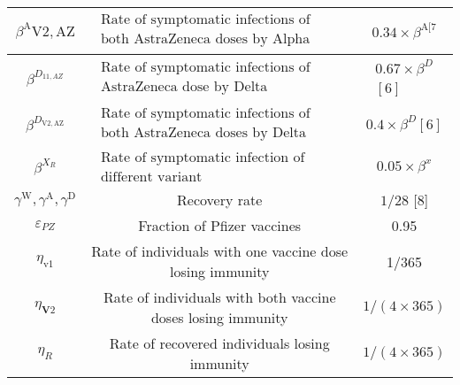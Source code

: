 \documentclass[10pt]{article}
\begin{document}
\begin{center}
\begin{tabular}{|c|c|c|}
\hline
$\beta^{\mathrm{A}} \mathrm{V} 2, \mathrm{AZ}$ & $\begin{array}{l}\text { Rate of symptomatic infections of individuals vaccinated with } \\ \text { both AstraZeneca doses by Alpha }\end{array}$ & $0.34 \times \beta^{\mathrm{A}[7}$ \\
\hline
$\beta^{D_{11, A Z}}$ & $\begin{array}{l}\text { Rate of symptomatic infections of individuals vaccinated with one } \\ \text { AstraZeneca dose by Delta }\end{array}$ & $\begin{array}{l}0.67 \times \beta^{D} \\ {[6]}\end{array}$ \\
\hline
$\beta^{D_{\mathrm{V} 2, \mathrm{AZ}}}$ & $\begin{array}{l}\text { Rate of symptomatic infections of individuals vaccinated with } \\ \text { both AstraZeneca doses by Delta }\end{array}$ & $0.4 \times \beta^{D}[6]$ \\
\hline
$\beta^{X_{R}}$ & $\begin{array}{l}\text { Rate of symptomatic infection of individual recovered from a } \\ \text { different variant }\end{array}$ & $0.05 \times \beta^{x}$ \\
\hline
$\gamma^{\mathrm{W}}, \gamma^{\mathrm{A}}, \gamma^{\mathrm{D}}$ & Recovery rate & $1 / 28$ [8] \\
\hline
$\varepsilon_{P Z}$ & Fraction of Pfizer vaccines & 0.95 \\
\hline
$\eta_{\mathrm{v} 1}$ & Rate of individuals with one vaccine dose losing immunity & 1/365 \\
\hline
$\eta_{\mathbf{V} 2}$ & Rate of individuals with both vaccine doses losing immunity & $1 /(4 \times 365)$ \\
\hline
$\eta_{R}$ & Rate of recovered individuals losing immunity & $1 /(4 \times 365)$ \\
\hline
\end{tabular}
\end{center}
​
\end{document}
